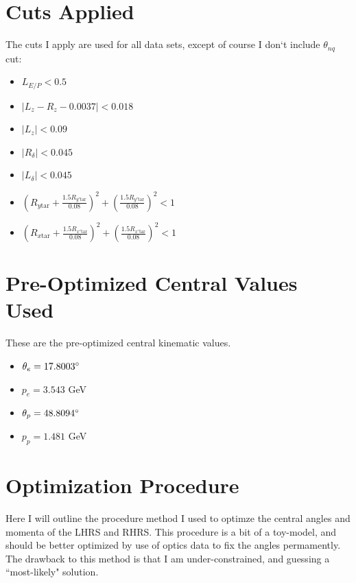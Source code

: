 \documentclass{article}
\begin{document}
\section*{Cuts Applied}
The cuts I apply are used for all data sets, except of course I don`t include $\theta_{nq}$ cut:
\begin{itemize}
\item{$L_{E/P} <  0.5 $}
\item{$|L_z - R_z - 0.0037| < 0.018$}
\item{$|L_z| < 0.09 $}
\item{$|R_\delta| < 0.045 $}
\item{$|L_\delta| < 0.045 $}
\item{$ \left( R_{y\textrm{tar}} + \frac{1.5 R_{y'\textrm{tar}}}{0.08} \right)^2 + \left( \frac{1.5 R_{y'\textrm{tar}}}{0.08} \right)^2 < 1 $}
\item{$ \left( R_{x\textrm{tar}} + \frac{1.5 R_{x'\textrm{tar}}}{0.08} \right)^2 + \left( \frac{1.5 R_{x'\textrm{tar}}}{0.08} \right)^2 < 1 $}
\end{itemize}

\section*{Pre-Optimized Central Values Used}
These are the pre-optimized central kinematic values.
\begin{itemize}
\item{$\theta_e = 17.8003\degree$}
\item{$p_e = 3.543$ GeV}
\item{$\theta_p = 48.8094\degree$}
\item{$p_p = 1.481$ GeV}
\end{itemize}

\section*{Optimization Procedure}
Here I will outline the procedure method I used to optimze the central angles and momenta of the LHRS and RHRS. This procedure is a bit of a toy-model, and should be better optimized by use of optics data to fix the angles permamently. The drawback to this method is that I am under-constrained, and guessing a ``most-likely" solution.\\
\end{document}
